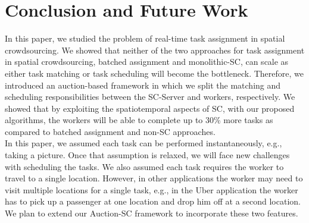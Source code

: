 \section{Conclusion and Future Work}
\label{sec:future}

In this paper, we studied the problem of real-time task assignment in spatial crowdsourcing. We showed that neither of the two approaches for task assignment in spatial crowdsourcing, batched assignment and monolithic-SC, can scale as either task matching or task scheduling will become the bottleneck. Therefore, we introduced an auction-based framework in which we split the matching and scheduling responsibilities between the SC-Server and workers, respectively. We showed that by exploiting the spatiotemporal aspects of SC, with our proposed algorithms, the workers will be able to complete up to 30\% more tasks as compared to batched assignment and non-SC approaches.\\

In this paper, we assumed each task can be performed instantaneously, e.g., taking a picture. Once that assumption is relaxed, we will face new challenges with scheduling the tasks. We also assumed each task requires the worker to travel to a single location. However, in other applications the worker may need to visit multiple locations for a single task, e.g., in the Uber application the worker has to pick up a passenger at one location and drop him off at a second location. We plan to extend our Auction-SC framework to incorporate these two features.